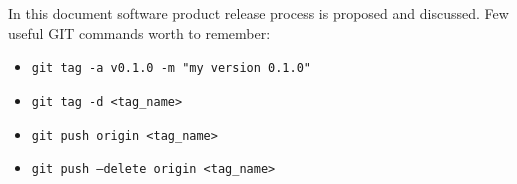 In this document software product release process is proposed and discussed.
Few useful GIT commands worth to remember:
\begin{itemize}
    \item \texttt{git tag -a v0.1.0 -m "my version 0.1.0"}
    \item \texttt{git tag -d <tag\_name>}
    \item \texttt{git push origin <tag\_name>}
    \item \texttt{git push --delete origin <tag\_name>}
\end{itemize}